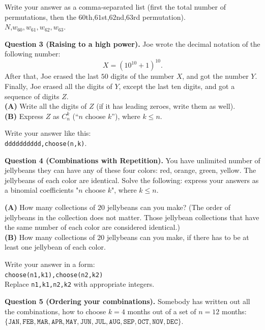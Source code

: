 \documentclass[jou]{apa6}
\begin{document}
Write your answer as a comma-separated list (first the total number of permutations, then the
$60$th,$61$st,$62$nd,$63$rd permutation).\\
$N$,$w_{60},w_{61},w_{62},w_{63}$. 


\vspace{6pt}
{\bf Question 3 (Raising to a high power).} 
Joe wrote the decimal notation of the following number:
$$X = \left( 10^{10} + 1 \right)^{10}.$$
After that, Joe erased the last $50$ digits of the number $X$, and got the number $Y$. 
Finally, Joe erased all the digits of $Y$, except the last ten digits, and got a sequence of digits $Z$.\\
{\bf (A)} Write all the digits of $Z$ (if it has leading zeroes, write them as well).\\
{\bf (B)} Express $Z$ as $C_n^k$ (``$n$ choose $k$''), where $k \leq n$.

Write your answer like this:\\ {\tt dddddddddd,choose(n,k)}.


\vspace{6pt}
{\bf Question 4 (Combinations with Repetition).} You have unlimited number of jellybeans \textendash{}
they can have any of these four colors: red, orange, green, yellow. The jellybeans of each
color are identical. Solve the following: express your answers as a binomial coefficients "$n$ choose $k$", 
where $k \leq n$.

{\bf (A)}  How many collections of $20$ jellybeans can you make? (The order of jellybeans in the collection 
does not matter. Those jellybean collections that have the same number of each color are considered identical.)\\
{\bf (B)} How many collections of $20$ jellybeans can you make, if there has to be at least one jellybean 
of each color. 

Write your answer in a form:\\ {\tt choose(n1,k1),choose(n2,k2)}\\
Replace {\tt n1,k1,n2,k2} with appropriate integers.


\vspace{6pt}
{\bf Question 5 (Ordering your combinations).} 
Somebody has written out all the combinations, how to choose $k=4$ months out of a set of 
$n=12$ months:\\
{\small
$\{ \mathtt{JAN},\mathtt{FEB},\mathtt{MAR},\mathtt{APR},\mathtt{MAY},\mathtt{JUN},
\mathtt{JUL},\mathtt{AUG},\mathtt{SEP},\mathtt{OCT},\mathtt{NOV},\mathtt{DEC} \}.$
}
\end{document}
